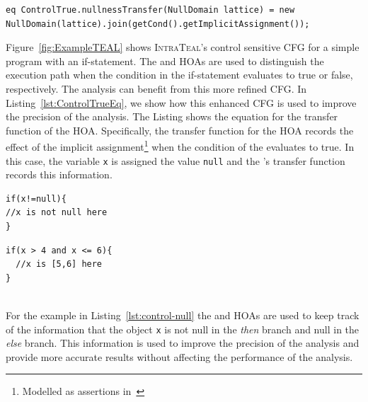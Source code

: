 \begin{lstlisting}[language=JastAdd,label={lst:ControlTrueEq},float=h,captionpos=b, caption={Transfer function for \astnode{ControlTrue} HOA.}]
eq ControlTrue.nullnessTransfer(NullDomain lattice) = new NullDomain(lattice).join(getCond().getImplicitAssignment());
\end{lstlisting}
Figure~\ref{fig:ExampleTEAL} shows \textsc{IntraTeal}'s control sensitive CFG for a simple
program with an if-statement. The  and  HOAs are
used to distinguish the execution path when the condition in the if-statement evaluates to
true or false, respectively. The  analysis can benefit from this more refined CFG.
In Listing~\ref{lst:ControlTrueEq}, we show how this enhanced CFG is used to improve the precision of the analysis.
The Listing shows the equation for the transfer function of the  HOA.
Specifically, the transfer function for the  HOA
records the effect of the implicit assignment\footnote{Modelled as assertions in~\cite{spa}} when the condition of the  evaluates to true.
In this case, the variable \texttt{x} is assigned the value \texttt{null} and the 's transfer function
records this information.

\begin{minipage}{0.45\textwidth}
  \begin{lstlisting}[language=JastAdd,caption={Control sensitivity to improve null pointer analysis.}, label={lst:control-null}]
if(x!=null){
//x is not null here
}
  \end{lstlisting}
  \end{minipage}\hfill%
  \begin{minipage}{0.45\textwidth}
  \begin{lstlisting}[language=JastAdd,caption={Control sensitivity to improve interval analysis.}, label={lst:control-interval}]
if(x > 4 and x <= 6){
  //x is [5,6] here
}
  \end{lstlisting}
\end{minipage}\\
For the example in Listing~\ref{lst:control-null} the  and 
HOAs are used to keep track of the information that the object \texttt{x} is not null
in the \emph{then} branch and null in the \emph{else} branch.
This information is used to improve the precision of the analysis and provide
more accurate results without affecting the performance of the analysis.

